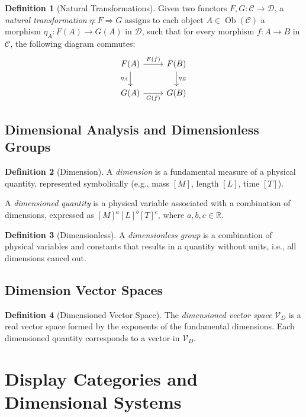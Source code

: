 \documentclass{article}
\theoremstyle{definition}
\newtheorem{definition}{Definition}[section]
\theoremstyle{remark}
\begin{document}
	\begin{definition}[Natural Transformations]
		Given two functors $F, G: \mathcal{C} \rightarrow \mathcal{D}$, a \emph{natural transformation} $\eta: F \Rightarrow G$ assigns to each object $A \in \operatorname{Ob}(\mathcal{C})$ a morphism $\eta_A: F(A) \rightarrow G(A)$ in $\mathcal{D}$, such that for every morphism $f: A \rightarrow B$ in $\mathcal{C}$, the following diagram commutes:
		\[
		\begin{tikzcd}
			F(A) \arrow[r, "F(f)"] \arrow[d, "\eta_A"'] & F(B) \arrow[d, "\eta_B"] \\
			G(A) \arrow[r, "G(f)"'] & G(B)
		\end{tikzcd}
		\]
	\end{definition}
	
	\subsection{Dimensional Analysis and Dimensionless Groups}
	
	\begin{definition}[Dimension]
		A \emph{dimension} is a fundamental measure of a physical quantity, represented symbolically (e.g., mass $[M]$, length $[L]$, time $[T]$).
		
		A \emph{dimensioned quantity} is a physical variable associated with a combination of dimensions, expressed as $[M]^a[L]^b[T]^c$, where $a, b, c \in \mathbb{R}$.
	\end{definition}
	
	\begin{definition}[Dimensionless]
		A \emph{dimensionless group} is a combination of physical variables and constants that results in a quantity without units, i.e., all dimensions cancel out.
	\end{definition}
	
	\subsection{Dimension Vector Spaces}
	
	\begin{definition}[Dimensioned Vector Space]
		The \emph{dimensioned vector space} $\mathcal{V}_D$ is a real vector space formed by the exponents of the fundamental dimensions. Each dimensioned quantity corresponds to a vector in $\mathcal{V}_D$.
	\end{definition}
	
	\section{Display Categories and Dimensional Systems}
	
\end{document}
